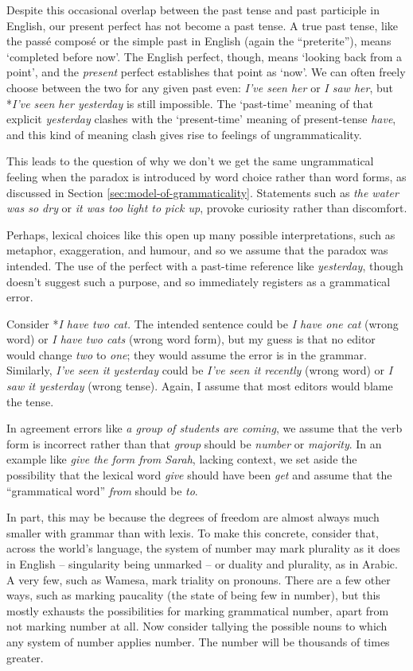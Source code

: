 Despite this occasional overlap between the past tense and past participle in English, our present perfect has not become a past tense. A true past tense, like the passé composé or the simple past in English (again the ``preterite''), means `completed before now'. The English perfect, though, means `looking back from a point', and the \textit{present} perfect establishes that point as `now'. We can often freely choose between the two for any given past even: \textit{I've seen her} or \textit{I saw her}, but *\textit{I've seen her yesterday} is still impossible. The `past-time' meaning of that explicit \textit{yesterday} clashes with the `present-time' meaning of present-tense \textit{have}, and this kind of meaning clash gives rise to feelings of ungrammaticality.

This leads to the question of why we don't we get the same ungrammatical feeling when the paradox is introduced by word choice rather than word forms, as discussed in Section \ref{sec:model-of-grammaticality}. Statements such as \textit{the water was so dry} or \textit{it was too light to pick up}, provoke curiosity rather than discomfort.

Perhaps, lexical choices like this open up many possible interpretations, such as metaphor, exaggeration, and humour, and so we assume that the paradox was intended. The use of the perfect with a past-time reference like \textit{yesterday}, though doesn't suggest such a purpose, and so immediately registers as a grammatical error.

Consider *\textit{I have two cat.} The intended sentence could be \textit{I have one cat} (wrong word) or \textit{I have two cats} (wrong word form), but my guess is that no editor would change \textit{two} to \textit{one}; they would assume the error is in the grammar. Similarly, \textit{I've seen it yesterday} could be \textit{I've seen it recently} (wrong word) or \textit{I saw it yesterday} (wrong tense). Again, I assume that most editors would blame the tense.

In agreement errors like \textit{a group of students are coming}, we assume that the verb form is incorrect rather than that \textit{group} should be \textit{number} or \textit{majority}. In an example like \textit{give the form from Sarah}, lacking context, we set aside the possibility that the lexical word \textit{give} should have been \textit{get} and assume that the ``grammatical word'' \textit{from} should be \textit{to}.

In part, this may be because the degrees of freedom are almost always much smaller with grammar than with lexis. To make this concrete, consider that, across the world's language, the system of number may mark plurality as it does in English -- singularity being unmarked -- or duality and plurality, as in Arabic. A very few, such as Wamesa, mark triality on pronouns. There are a few other ways, such as marking paucality (the state of being few in number), but this mostly exhausts the possibilities for marking grammatical number, apart from not marking number at all. Now consider tallying the possible nouns to which any system of number applies number. The number will be thousands of times greater.

